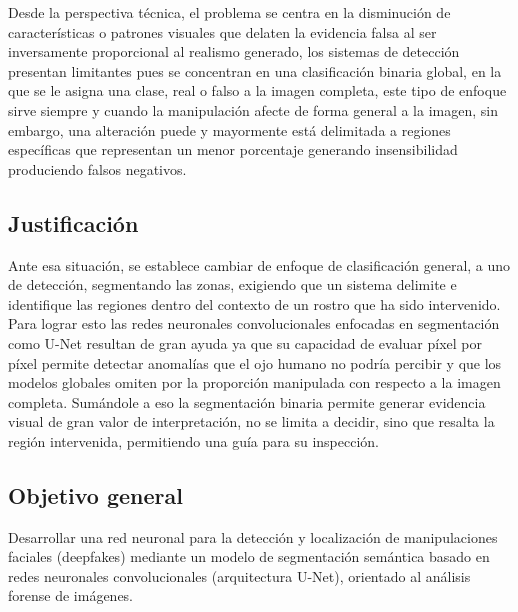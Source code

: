 Desde la perspectiva técnica, el problema se centra en la disminución de características o patrones visuales que delaten la evidencia falsa al ser inversamente proporcional al realismo generado, los sistemas de detección presentan limitantes pues se concentran en una clasificación binaria global, en la que se le asigna una clase, real o falso a la imagen completa, este tipo de enfoque sirve siempre y cuando la manipulación afecte de forma general a la imagen, sin embargo, una alteración puede y mayormente está delimitada a regiones específicas que representan un menor porcentaje generando insensibilidad produciendo falsos negativos.


\subsection{Justificación}

Ante esa situación, se establece cambiar de enfoque  de clasificación general, a uno de detección, segmentando las zonas, exigiendo que un sistema delimite e identifique las regiones dentro del contexto de un rostro que ha sido intervenido. Para lograr esto las redes neuronales convolucionales enfocadas en segmentación como U-Net resultan de gran ayuda ya que su capacidad de evaluar píxel por píxel permite detectar anomalías que el ojo humano no podría percibir y que los modelos globales omiten por la proporción manipulada con respecto a la imagen completa. Sumándole a eso la segmentación binaria permite generar evidencia visual de gran valor de interpretación, no se limita a decidir, sino que resalta la región intervenida, permitiendo una guía para su inspección.

\subsection{Objetivo general}

Desarrollar una red neuronal para la detección y localización de manipulaciones faciales (deepfakes) mediante un modelo de segmentación semántica basado en redes neuronales convolucionales (arquitectura U-Net), orientado al análisis forense de imágenes.

